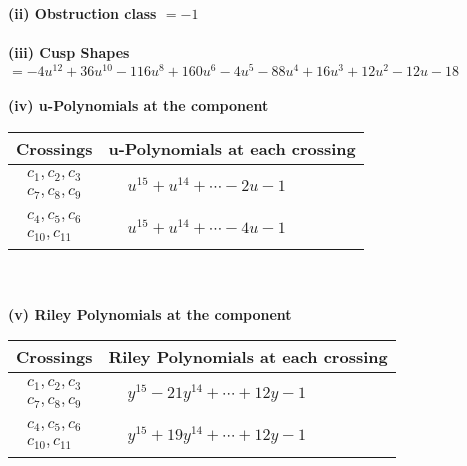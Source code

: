 \documentclass[1p]{elsarticle_modified}
\theoremstyle{definition}
\begin{document}
\flushleft \textbf{(ii) Obstruction class $= -1$}\\~\\
\flushleft \textbf{(iii) Cusp Shapes $= -4 u^{12}+36 u^{10}-116 u^8+160 u^6-4 u^5-88 u^4+16 u^3+12 u^2-12 u-18$}\\~\\
\newpage\renewcommand{\arraystretch}{1}
\flushleft \textbf{(iv) u-Polynomials at the component}\newline \\
\begin{tabular}{m{50pt}|m{274pt}}
Crossings & \hspace{64pt}u-Polynomials at each crossing \\
\hline $$\begin{aligned}c_{1},c_{2},c_{3}\\c_{7},c_{8},c_{9}\end{aligned}$$&$\begin{aligned}
&u^{15}+u^{14}+\cdots-2 u-1
\end{aligned}$\\
\hline $$\begin{aligned}c_{4},c_{5},c_{6}\\c_{10},c_{11}\end{aligned}$$&$\begin{aligned}
&u^{15}+u^{14}+\cdots-4 u-1
\end{aligned}$\\
\hline
\end{tabular}\\~\\
\newpage\renewcommand{\arraystretch}{1}
\flushleft \textbf{(v) Riley Polynomials at the component}\newline \\
\begin{tabular}{m{50pt}|m{274pt}}
Crossings & \hspace{64pt}Riley Polynomials at each crossing \\
\hline $$\begin{aligned}c_{1},c_{2},c_{3}\\c_{7},c_{8},c_{9}\end{aligned}$$&$\begin{aligned}
&y^{15}-21 y^{14}+\cdots+12 y-1
\end{aligned}$\\
\hline $$\begin{aligned}c_{4},c_{5},c_{6}\\c_{10},c_{11}\end{aligned}$$&$\begin{aligned}
&y^{15}+19 y^{14}+\cdots+12 y-1
\end{aligned}$\\
\hline
\end{tabular}\\~\\
\end{document}
